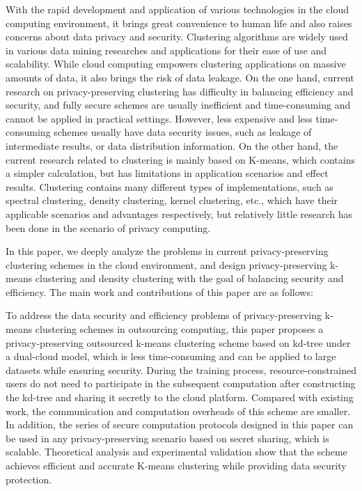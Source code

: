 \begin{eabstract}
With the rapid development and application of various technologies in the cloud computing environment, it brings great convenience to human life and also raises concerns about data privacy and security. Clustering algorithms are widely used in various data mining researches and applications for their ease of use and scalability. While cloud computing empowers clustering applications on massive amounts of data, it also brings the risk of data leakage. 
On the one hand, current research on privacy-preserving clustering has difficulty in balancing efficiency and security, and fully secure schemes are usually inefficient and time-consuming and cannot be applied in practical settings. However, less expensive and less time-consuming schemes usually have data security issues, such as leakage of intermediate results, or data distribution information. 
On the other hand, the current research related to clustering is mainly based on K-means, which contains a simpler calculation, but has limitations in application scenarios and effect results. Clustering contains many different types of implementations, such as spectral clustering, density clustering, kernel clustering, etc., which have their applicable scenarios and advantages respectively, but relatively little research has been done in the scenario of privacy computing.

In this paper, we deeply analyze the problems in current privacy-preserving clustering schemes in the cloud environment, and design privacy-preserving k-means clustering and density clustering with the goal of balancing security and efficiency. The main work and contributions of this paper are as follows:
\begin{compactenum}
\item To address the data security and efficiency problems of privacy-preserving k-means clustering schemes in outsourcing computing, this paper proposes a privacy-preserving outsourced k-means clustering scheme based on kd-tree under a dual-cloud model, which is less time-consuming and can be applied to large datasets while ensuring security. During the training process, resource-constrained users do not need to participate in the subsequent computation after constructing the kd-tree and sharing it secretly to the cloud platform. Compared with existing work, the communication and computation overheads of this scheme are smaller. In addition, the series of secure computation protocols designed in this paper can be used in any privacy-preserving scenario based on secret sharing, which is scalable. Theoretical analysis and experimental validation show that the scheme achieves efficient and accurate K-means clustering while providing data security protection.


\end{compactenum}
\end{eabstract}
